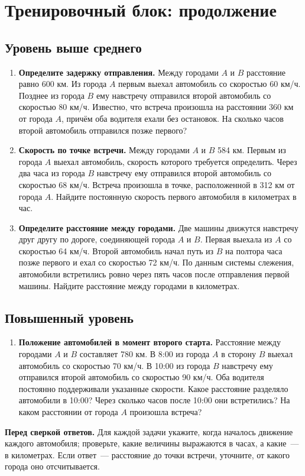 \documentclass[a4paper,11pt]{article}
\newcommand{\qtask}[2]{\needspace{7\baselineskip}\item \textbf{#1} #2}
\begin{document}
\section*{Тренировочный блок: продолжение}
\subsection*{Уровень выше среднего}
\begin{enumerate}[label=\textbf{\arabic*.},leftmargin=*,start=7,itemsep=15pt]
\qtask{Определите задержку отправления.}{
Между городами $A$ и $B$ расстояние равно 600 км. Из города $A$ первым выехал автомобиль со скоростью 60 км/ч. Позднее из города $B$ ему навстречу отправился второй автомобиль со скоростью 80 км/ч. Известно, что встреча произошла на расстоянии 360 км от города $A$, причём оба водителя ехали без остановок. На сколько часов второй автомобиль отправился позже первого?}
\qtask{Скорость по точке встречи.}{
Между городами $A$ и $B$ 584 км. Первым из города $A$ выехал автомобиль, скорость которого требуется определить. Через два часа из города $B$ навстречу ему отправился второй автомобиль со скоростью 68 км/ч. Встреча произошла в точке, расположенной в 312 км от города $A$. Найдите постоянную скорость первого автомобиля в километрах в час.}
\qtask{Определите расстояние между городами.}{
Две машины движутся навстречу друг другу по дороге, соединяющей города $A$ и $B$. Первая выехала из $A$ со скоростью 64 км/ч. Второй автомобиль начал путь из $B$ на полтора часа позже первого и ехал со скоростью 72 км/ч. По данным системы слежения, автомобили встретились ровно через пять часов после отправления первой машины. Найдите расстояние между городами в километрах.}
\end{enumerate}
\subsection*{Повышенный уровень}
\begin{enumerate}[label=\textbf{\arabic*.},leftmargin=*,start=10,itemsep=15pt]
\qtask{Положение автомобилей в момент второго старта.}{
Расстояние между городами $A$ и $B$ составляет 780 км. В 8:00 из города $A$ в сторону $B$ выехал автомобиль со скоростью 70 км/ч. В 10:00 из города $B$ навстречу ему отправился второй автомобиль со скоростью 90 км/ч. Оба водителя постоянно поддерживали указанные скорости. Какое расстояние разделяло автомобили в 10:00? Через сколько часов после 10:00 они встретились? На каком расстоянии от города $A$ произошла встреча?}
\end{enumerate}
\vfill
\noindent\textcolor{darkaccent}{\bfseries Перед сверкой ответов.} Для каждой задачи укажите, когда началось движение каждого автомобиля; проверьте, какие величины выражаются в часах, а какие~--- в километрах. Если ответ~--- расстояние до точки встречи, уточните, от какого города оно отсчитывается.
\end{document}

